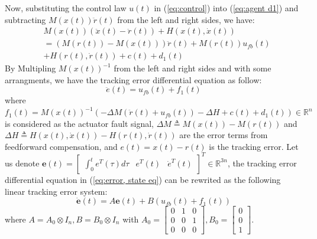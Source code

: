 \documentclass{ieeeaccess}
\newtheorem{remark}{Remark}
\begin{document}
Now, substituting the control law $u(t)$ in (\ref{eq:control}) into (\ref{eq:agent d1}) and subtracting $M(x(t))\ddot{r}(t)$ from the left and right sides, we have:
\begin{equation} \label{eq:agent1}
    \begin{split}
        & M(x(t))(\ddot{x}(t)-\ddot{r}(t)) + H(x(t),\dot{x}(t)) \\
        & =(M(r(t))-M(x(t)))\ddot{r}(t) + M(r(t))u_{fb}(t) \\
        & + H(r(t),\dot{r}(t)) + c(t) + d_1(t)
    \end{split}
\end{equation}
By Multipling $M(x(t))^{-1}$ from the left and right sides and with some arrangments, we have the tracking error differential equation as follow:
\begin{equation} \label{eq:error, state eq}
    \ddot{e}(t) = u_{fb}(t) + f_1(t)
\end{equation}
where $f_1(t) = M(x(t))^{-1}(-\Delta M (\ddot{r}(t)+u_{fb}(t)) -\Delta H + c(t) + d_1(t))\in\mathbb{R}^n$ is considered as the actuator fault signal, $\Delta M \triangleq M(x(t)) - M(r(t))$ and $ \Delta H \triangleq H(x(t),\dot{x}(t)) - H(r(t),\dot{r}(t))$ are the error terms from feedforward compensation, and $e(t)= x(t)-r(t)$ is the tracking error.
Let us denote $\pmb{e}(t)=\begin{bmatrix}
    \int_{0}^{t}e^T(\tau)d\tau & e^T(t) & \dot{e}^T(t)
\end{bmatrix}^T\in\mathbb{R}^{3n}$, the tracking error differential equation in (\ref{eq:error, state eq}) can be rewrited as the following linear tracking error system:
\begin{equation} \label{eq:linear f1}
    \dot{\pmb{e}}(t)=A\pmb{e}(t)+B(u_{fb}(t)+f_1(t))
\end{equation}
where $ A = A_0\otimes I_n, B = B_0\otimes I_n$
with $A_0 = \begin{bmatrix}
    0 & 1 & 0 \\ 0 & 0 & 1 \\ 0 & 0 & 0
\end{bmatrix}, B_0 = \begin{bmatrix}
0 \\ 0 \\ 1
\end{bmatrix}$. 
\end{document}
